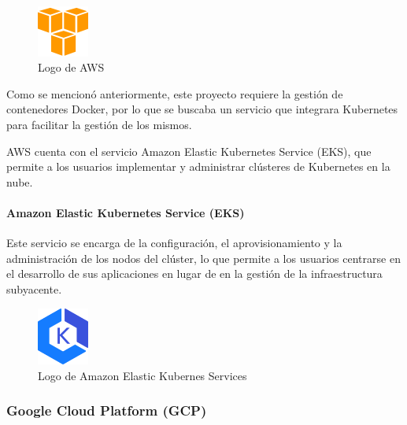                 \begin{figure}[htbp]
                    \centering

                    \includegraphics[width=0.15\textwidth]{images/Logos/aws.png}
                    \caption{Logo de AWS}

                    \label{fig:aws-logo}
                \end{figure}

                Como se mencionó anteriormente, este proyecto requiere la gestión de contenedores Docker, por lo que se buscaba un servicio que integrara Kubernetes para facilitar la gestión de los mismos.

                AWS cuenta con el servicio Amazon Elastic Kubernetes Service (EKS), que permite a los usuarios implementar y administrar clústeres de Kubernetes en la nube.

                \paragraph{Amazon Elastic Kubernetes Service (EKS)}

                    Este servicio se encarga de la configuración, el aprovisionamiento y la administración de los nodos del clúster, lo que permite a los usuarios centrarse en el desarrollo de sus aplicaciones en lugar de en la gestión de la infraestructura subyacente. 
                    
                    \begin{figure}[htbp]
                        \centering
    
                        \includegraphics[width=0.15\textwidth]{images/Logos/eks.png}
                        \caption{Logo de Amazon Elastic Kubernes Services}
    
                        \label{fig:eks-logo}
                    \end{figure}

            \subsubsection{Google Cloud Platform (GCP)}


